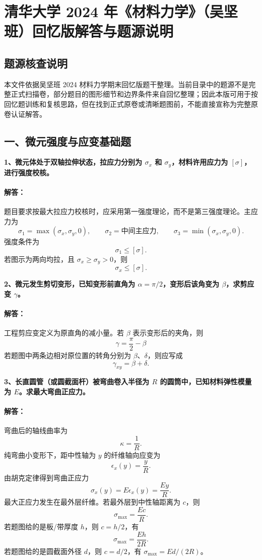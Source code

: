 \documentclass[11pt,a4paper]{ctexrep}
\begin{document}
\chapter{清华大学 2024 年《材料力学》（吴坚班）回忆版解答与题源说明}
{


\vspace{-1.0cm}

\section*{题源核查说明}

本文件依据吴坚班 2024 材料力学期末回忆版题干整理。当前目录中的题源不是完整正式扫描卷，部分题目的图形细节和边界条件来自回忆整理；因此本版可用于按回忆题训练和复核思路，但在找到正式原卷或清晰题图前，不能直接宣称为完整原卷认证解答。

\section*{一、微元强度与应变基础题}

\textbf{1、微元体处于双轴拉伸状态，拉应力分别为 $\sigma_x$ 和 $\sigma_y$，材料许用应力为 $[\sigma]$，进行强度校核。}

\subsubsection*{解答：}
题目要求按最大拉应力校核时，应采用第一强度理论，而不是第三强度理论。主应力为
\[
    \sigma_1=\max(\sigma_x,\sigma_y,0),\qquad
    \sigma_2=\text{中间主应力},\qquad
    \sigma_3=\min(\sigma_x,\sigma_y,0).
\]
强度条件为
\[
    \sigma_1\le[\sigma].
\]
若图示为两向均拉，且 $\sigma_x\ge\sigma_y>0$，则
\[
    \sigma_x\le[\sigma].
\]

\textbf{2、微元发生剪切变形，已知变形前直角为 $\alpha = \pi/2$，变形后该角变为 $\beta$，求剪应变 $\gamma$。}

\subsubsection*{解答：}
工程剪应变定义为原直角的减小量。若 $\beta$ 表示变形后的夹角，则
\[
    \gamma = \frac{\pi}{2} - \beta
\]
若题图中两条边相对原位置的转角分别为 $\beta$、$\delta$，则应写成
\[
    \gamma_{xy}=\beta+\delta.
\]

\textbf{3、长直圆管（或圆截面杆）被弯曲卷入半径为 $R$ 的圆筒中，已知材料弹性模量为 $E$。求最大弯曲正应力。}

\subsubsection*{解答：}
弯曲后的轴线曲率为
\[
    \kappa=\frac{1}{R}.
\]
纯弯曲小变形下，距中性轴为 $y$ 的纤维轴向应变为
\[
    \epsilon_x(y)=\frac{y}{R}.
\]
由胡克定律得到弯曲正应力
\[
    \sigma_x(y)=E\epsilon_x(y)=\frac{Ey}{R}.
\]
最大正应力发生在最外层纤维。若最外层到中性轴距离为 $c$，则
\[
    \sigma_{\max}=\frac{Ec}{R}.
\]
若题图给的是板/带厚度 $h$，则 $c=h/2$，有
\[
    \sigma_{\max}=\frac{Eh}{2R}.
\]
若题图给的是圆截面外径 $d$，则 $c=d/2$，有 $\sigma_{\max}=Ed/(2R)$。


}
\end{document}
